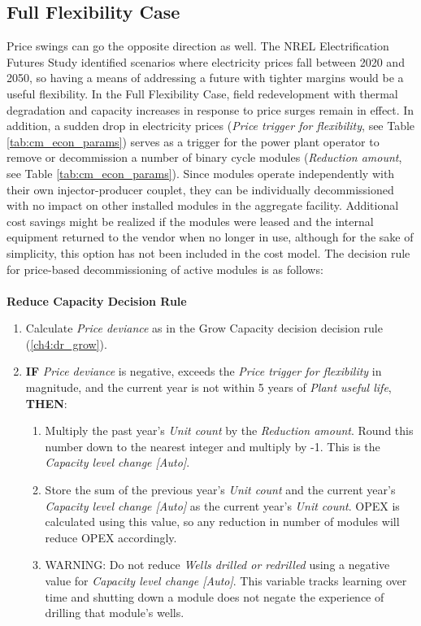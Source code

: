 \subsection{Full Flexibility Case}

Price swings can go the opposite direction as well. The NREL Electrification Futures Study \citep{murphy_electrification_2021} identified scenarios where electricity prices fall between 2020 and 2050, so having a means of addressing a future with tighter margins would be a useful flexibility. In the Full Flexibility Case, field redevelopment with thermal degradation and capacity increases in response to price surges remain in effect. In addition, a sudden drop in electricity prices (\textit{Price trigger for flexibility}, see Table \ref{tab:cm_econ_params}) serves as a trigger for the power plant operator to remove or decommission a number of binary cycle modules (\textit{Reduction amount}, see Table \ref{tab:cm_econ_params}). Since modules operate independently with their own injector-producer couplet, they can be individually decommissioned with no impact on other installed modules in the aggregate facility. Additional cost savings might be realized if the modules were leased and the internal equipment returned to the vendor when no longer in use, although for the sake of simplicity, this option has not been included in the cost model. The decision rule for price-based decommissioning of active modules is as follows:
\\
\\
\textbf{Reduce Capacity Decision Rule}
\label{ch4:dr_reduce}
\begin{enumerate}
    \item Calculate \textit{Price deviance} as in the Grow Capacity decision decision rule (\ref{ch4:dr_grow}).
    \item \textbf{IF} \textit{Price deviance} is negative, exceeds the \textit{Price trigger for flexibility} in magnitude, and the current year is not within 5 years of \textit{Plant useful life}, \textbf{THEN}:
    \begin{enumerate}
        \item Multiply the past year’s \textit{Unit count} by the \textit{Reduction amount}. Round this number down to the nearest integer and multiply by -1. This is the \textit{Capacity level change [Auto]}.
        \item Store the sum of the previous year’s \textit{Unit count} and the current year’s \textit{Capacity level change [Auto]} as the current year’s \textit{Unit count}. OPEX is calculated using this value, so any reduction in number of modules will reduce OPEX accordingly.
        \item WARNING: Do not reduce \textit{Wells drilled or redrilled} using a negative value for \textit{Capacity level change [Auto]}. This variable tracks learning over time and shutting down a module does not negate the experience of drilling that module’s wells.
    \end{enumerate}
\end{enumerate}


